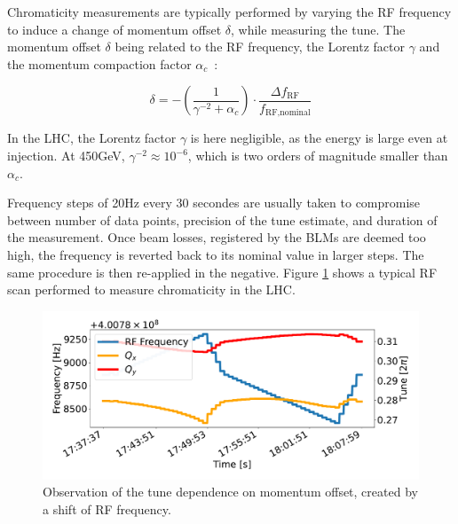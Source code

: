 Chromaticity measurements are typically performed by varying the RF frequency to induce a change of
momentum offset $\delta$, while measuring the tune.  The momentum offset $\delta$ being related to
the RF frequency, the Lorentz factor $\gamma$ and the momentum compaction factor
$\alpha_c$~\cite{keintzel_jacqueline_beam_nodate}:

\begin{equation}
    \delta = - \left(\frac{1}{\gamma^{-2} + \alpha_c}\right) \cdot \frac{\Delta f_{\text{RF}}}{f_{\text{RF,nominal}}}
    \label{eq:dpp_rf}
\end{equation}

In the LHC, the Lorentz factor $\gamma$ is here negligible, as the energy is large even at injection.
At 450GeV, $\gamma^{-2} \approx 10^{-6}$, which is two orders of magnitude smaller than $\alpha_c$.

Frequency steps of 20Hz every 30 secondes are usually taken to compromise between number of data
points, precision of the tune estimate, and duration of the measurement. Once beam losses,
registered by the BLMs are deemed too high, the frequency is reverted back to its nominal value in
larger steps. The same procedure is then re-applied in the negative. Figure
\ref{fig:measurements:rf_scan} shows a typical RF scan performed to measure chromaticity in the LHC.

\begin{figure}[H]
    \centering
    \includegraphics[width=1\textwidth]{images/rf_scan.pdf}
    \caption{Observation of the tune dependence on momentum offset, created by a shift of RF
             frequency.}
    \label{fig:measurements:rf_scan}
\end{figure}




\subsubsection{}

